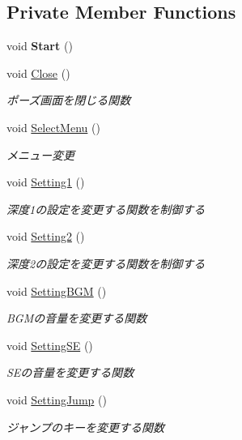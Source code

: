 \subsection*{Private Member Functions}
\begin{DoxyCompactItemize}
\item 
\mbox{\label{class_pause_a2676d511f741a690dd8a1d6f64aef89c}} 
void {\bfseries Start} ()
\item 
void \hyperlink{class_pause_a36cf62bf6f61444398a76283c40372a3}{Close} ()
\begin{DoxyCompactList}\small\item\em ポーズ画面を閉じる関数 \end{DoxyCompactList}\item 
void \hyperlink{class_pause_ab00490b873a9359aae7e84f9145e6b6e}{Select\+Menu} ()
\begin{DoxyCompactList}\small\item\em メニュー変更 \end{DoxyCompactList}\item 
void \hyperlink{class_pause_ae232ecdb930782ddadd1c8ff94b5a232}{Setting1} ()
\begin{DoxyCompactList}\small\item\em 深度1の設定を変更する関数を制御する \end{DoxyCompactList}\item 
void \hyperlink{class_pause_a8fde416d52c686a5df745b56193703cd}{Setting2} ()
\begin{DoxyCompactList}\small\item\em 深度2の設定を変更する関数を制御する \end{DoxyCompactList}\item 
void \hyperlink{class_pause_aaf1a1ade7e3f8d741a454bc3dd4a2a39}{Setting\+B\+GM} ()
\begin{DoxyCompactList}\small\item\em B\+G\+Mの音量を変更する関数 \end{DoxyCompactList}\item 
void \hyperlink{class_pause_a169932331432bf421d19a9fafdd6800f}{Setting\+SE} ()
\begin{DoxyCompactList}\small\item\em S\+Eの音量を変更する関数 \end{DoxyCompactList}\item 
void \hyperlink{class_pause_a5dff9113158ef08a7c9ee48b12827b22}{Setting\+Jump} ()
\begin{DoxyCompactList}\small\item\em ジャンプのキーを変更する関数 \end{DoxyCompactList}\item 

\end{DoxyCompactItemize}
